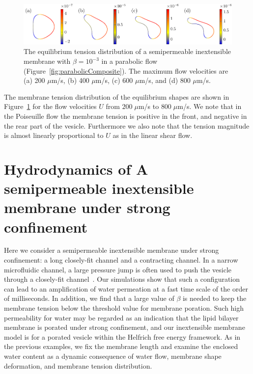 \documentclass[prb,preprint,showpacs,preprintnumbers,amsmath,amssymb,longbibliography]{revtex4-1}
\newif\ifTikz
\begin{document}
\begin{figure}[htp]
  \centering
  \ifTikz
  
  \else
  \includegraphics{figures/parabolicTensions.pdf}
  \fi
  \caption{\label{fig:parabolicTensions} The equilibrium tension
  distribution of a semipermeable inextensible membrane with
  $\beta=10^{-3}$ in a parabolic flow
  (Figure~\ref{fig:parabolicComposite}). The maximum flow velocities are
  (a) 200 $\mu$m/s, (b) 400 $\mu$m/s, (c) 600 $\mu$m/s, and (d) 800
  $\mu$m/s.}
\end{figure}
 The membrane tension distribution of the equilibrium shapes are shown
 in Figure~\ref{fig:parabolicTensions} for the flow velocities $U$ from
 $200\;\mu$m/s to $800 \;\mu$m/s. We note that in the Poiseuille flow
 the membrane tension is positive in the front, and negative in the rear
 part of the vesicle. Furthermore we also note that the tension
 magnitude is almost linearly proportional to $U$ as in the linear shear
 flow.


\section{Hydrodynamics of A semipermeable inextensible membrane under strong confinement\label{sec:confinement}}
Here we consider a semipermeable inextensible membrane under strong
confinement: a long closely-fit channel and a contracting channel. In a
narrow microfluidic channel, a large pressure jump is often used to push
the vesicle through a closely-fit channel~\cite{abk-fai-sto2006}. Our
simulations show that such a configuration can lead to an amplification
of water permeation at a fast time scale of the order of milliseconds.
In addition, we find that a large value of $\beta$ is needed to keep the
membrane tension below the threshold value for membrane poration. Such
high permeability for water may be regarded as an indication that the
lipid bilayer membrane is porated under strong confinement, and our
inextensible membrane model is for a porated vesicle within the Helfrich
free energy framework. As in the previous examples, we fix the membrane
length and examine the enclosed water content as a dynamic consequence
of water flow, membrane shape deformation, and membrane tension
distribution.
\end{document}
